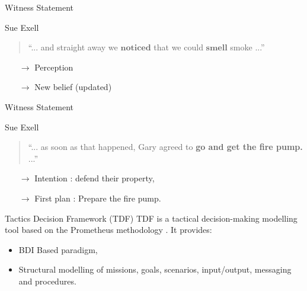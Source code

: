 \documentclass{beamer}
\begin{document}
    \begin{frame}{Witness Statement \cite{exell}}
      \begin{block}{Sue Exell}
        \begin{quote}
  				\textquotedblleft ... and straight away we $\textbf{noticed}$ that we could $\textbf{smell}$ smoke ...\textquotedblright
  			\end{quote}
      \end{block}
      \begin{itemize}
        \item[$\rightarrow$] Perception
        \item[$\rightarrow$] New belief (updated)
      \end{itemize}
    \end{frame}

    \begin{frame}{Witness Statement \cite{exell}}
      \begin{block}{Sue Exell}
        \begin{quote}
          \textquotedblleft ... as soon as that happened, Gary agreed to \textbf{go and get the fire pump.} ...\textquotedblright
        \end{quote}
      \end{block}
      \begin{itemize}
        \item[$\rightarrow$] Intention : defend their property,
        \item[$\rightarrow$] First plan : Prepare the fire pump.
      \end{itemize}
    \end{frame}

    \begin{frame}{Tactics Decision Framework (TDF)}
      TDF is a tactical decision-making modelling tool based on the Prometheus methodology \cite{framework2015}.
      It provides:
      \begin{itemize}
        \item BDI Based paradigm,
        \item Structural modelling of missions, goals, scenarios, input/output, messaging and procedures.
      \end{itemize}
    \end{frame}
\end{document}
